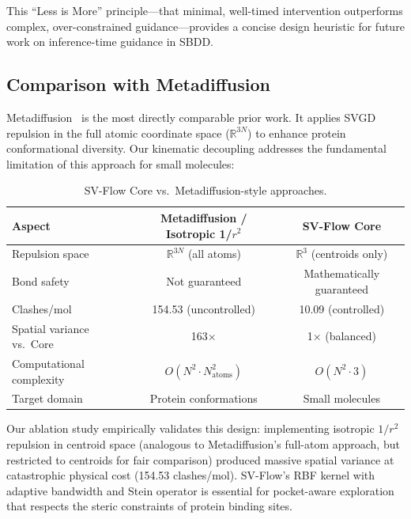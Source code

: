 \documentclass[a4paper,11pt]{article}
\begin{document}
This ``Less is More'' principle---that minimal, well-timed intervention
outperforms complex, over-constrained guidance---provides a concise design
heuristic for future work on inference-time guidance in SBDD.

\subsection{Comparison with Metadiffusion}

Metadiffusion~\cite{lam2026metadiffusion} is the most directly comparable prior
work.  It applies SVGD repulsion in the full atomic coordinate space
($\mathbb{R}^{3N}$) to enhance protein conformational diversity.  Our kinematic
decoupling addresses the fundamental limitation of this approach for small
molecules:

\begin{table}[H]
\centering
\caption{SV-Flow Core vs.\ Metadiffusion-style approaches.}
\label{tab:metadiff}
\begin{tabular}{l c c}
\toprule
\textbf{Aspect} & \textbf{Metadiffusion / Isotropic 1/$r^2$} & \textbf{SV-Flow Core} \\
\midrule
Repulsion space            & $\mathbb{R}^{3N}$ (all atoms)     & $\mathbb{R}^3$ (centroids only) \\
Bond safety                & Not guaranteed                    & Mathematically guaranteed \\
Clashes/mol                & 154.53 (uncontrolled)             & 10.09 (controlled) \\
Spatial variance vs.\ Core & 163$\times$                       & 1$\times$ (balanced) \\
Computational complexity   & $O(N^2 \cdot N_{\text{atoms}}^2)$ & $O(N^2 \cdot 3)$ \\
Target domain              & Protein conformations             & Small molecules \\
\bottomrule
\end{tabular}
\end{table}

Our ablation study empirically validates this design: implementing isotropic
$1/r^2$ repulsion in centroid space (analogous to Metadiffusion's full-atom
approach, but restricted to centroids for fair comparison) produced massive
spatial variance at catastrophic physical cost (154.53 clashes/mol).
SV-Flow's RBF kernel with adaptive bandwidth and Stein operator is essential for
pocket-aware exploration that respects the steric constraints of protein binding
sites.
\end{document}
